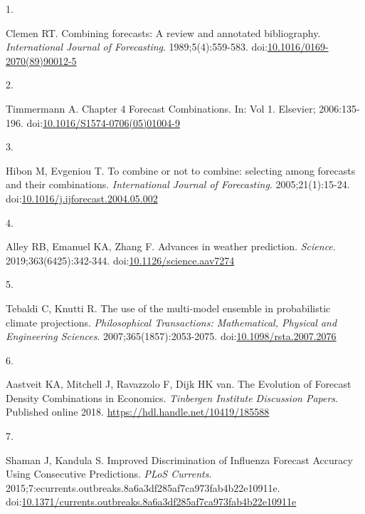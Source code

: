 \documentclass[
  letterpaper,
  DIV=11,
  numbers=noendperiod]{scrartcl}
\newlength{\cslhangindent}
\newlength{\csllabelwidth}
\newenvironment{CSLReferences}[2] %
 {\begin{list}{}{%
  \setlength{\itemindent}{0pt}
  \setlength{\leftmargin}{0pt}
  \setlength{\parsep}{0pt}
  \ifodd #1
   \setlength{\leftmargin}{\cslhangindent}
   \setlength{\itemindent}{-1\cslhangindent}
  \fi
  \setlength{\itemsep}{#2\baselineskip}}}
 {\end{list}}
\newcommand{\CSLLeftMargin}[1]{\parbox[t]{\csllabelwidth}{\strut#1\strut}}
\newcommand{\CSLRightInline}[1]{\parbox[t]{\linewidth - \csllabelwidth}{\strut#1\strut}}
\begin{document}
\label{refs}
\begin{CSLReferences}{0}{1}
\CSLLeftMargin{1. }%
\CSLRightInline{Clemen RT. Combining forecasts: A review and annotated
bibliography. \emph{International Journal of Forecasting}.
1989;5(4):559-583.
doi:\href{https://doi.org/10.1016/0169-2070(89)90012-5}{10.1016/0169-2070(89)90012-5}}

\CSLLeftMargin{2. }%
\CSLRightInline{Timmermann A. Chapter 4 Forecast Combinations. In: Vol
1. Elsevier; 2006:135-196.
doi:\href{https://doi.org/10.1016/S1574-0706(05)01004-9}{10.1016/S1574-0706(05)01004-9}}

\CSLLeftMargin{3. }%
\CSLRightInline{Hibon M, Evgeniou T. To combine or not to combine:
selecting among forecasts and their combinations. \emph{International
Journal of Forecasting}. 2005;21(1):15-24.
doi:\href{https://doi.org/10.1016/j.ijforecast.2004.05.002}{10.1016/j.ijforecast.2004.05.002}}

\CSLLeftMargin{4. }%
\CSLRightInline{Alley RB, Emanuel KA, Zhang F. Advances in weather
prediction. \emph{Science}. 2019;363(6425):342-344.
doi:\href{https://doi.org/10.1126/science.aav7274}{10.1126/science.aav7274}}

\CSLLeftMargin{5. }%
\CSLRightInline{Tebaldi C, Knutti R. The use of the multi-model ensemble
in probabilistic climate projections. \emph{Philosophical Transactions:
Mathematical, Physical and Engineering Sciences}.
2007;365(1857):2053-2075.
doi:\href{https://doi.org/10.1098/rsta.2007.2076}{10.1098/rsta.2007.2076}}

\CSLLeftMargin{6. }%
\CSLRightInline{Aastveit KA, Mitchell J, Ravazzolo F, Dijk HK van. The
Evolution of Forecast Density Combinations in Economics. \emph{Tinbergen
Institute Discussion Papers}. Published online 2018.
\url{https://hdl.handle.net/10419/185588}}

\CSLLeftMargin{7. }%
\CSLRightInline{Shaman J, Kandula S. Improved {Discrimination} of
{Influenza} {Forecast} {Accuracy} {Using} {Consecutive} {Predictions}.
\emph{PLoS Currents}.
2015;7:ecurrents.outbreaks.8a6a3df285af7ca973fab4b22e10911e.
doi:\href{https://doi.org/10.1371/currents.outbreaks.8a6a3df285af7ca973fab4b22e10911e}{10.1371/currents.outbreaks.8a6a3df285af7ca973fab4b22e10911e}}


\end{CSLReferences}
\end{document}

